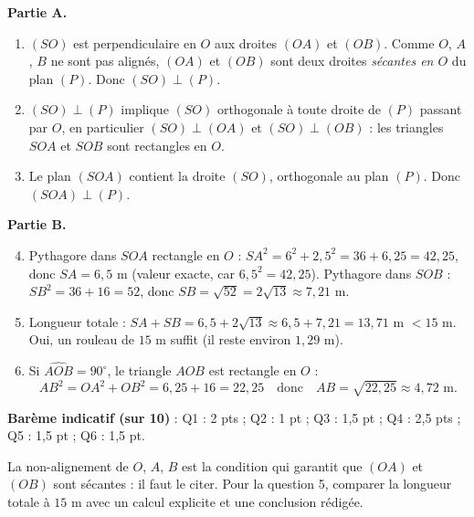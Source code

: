 \documentclass[11pt]{article}
\begin{document}
\begin{corrige}
\textbf{Partie A.}
\begin{enumerate}
\item $(SO)$ est perpendiculaire en $O$ aux droites $(OA)$ et $(OB)$. Comme $O$, $A$, $B$ ne sont pas alignés, $(OA)$ et $(OB)$ sont deux droites \emph{sécantes en $O$} du plan $(P)$. Donc $(SO) \perp (P)$.
\item $(SO) \perp (P)$ implique $(SO)$ orthogonale à toute droite de $(P)$ passant par $O$, en particulier $(SO) \perp (OA)$ et $(SO) \perp (OB)$ : les triangles $SOA$ et $SOB$ sont rectangles en $O$.
\item Le plan $(SOA)$ contient la droite $(SO)$, orthogonale au plan $(P)$. Donc $(SOA) \perp (P)$.
\end{enumerate}
\textbf{Partie B.}
\begin{enumerate}
\setcounter{enumi}{3}
\item Pythagore dans $SOA$ rectangle en $O$ : $SA^2 = 6^2 + 2{,}5^2 = 36 + 6{,}25 = 42{,}25$, donc $SA = 6{,}5$ m (valeur exacte, car $6{,}5^2 = 42{,}25$). Pythagore dans $SOB$ : $SB^2 = 36 + 16 = 52$, donc $SB = \sqrt{52} = 2\sqrt{13} \approx 7{,}21$ m.
\item Longueur totale : $SA + SB = 6{,}5 + 2\sqrt{13} \approx 6{,}5 + 7{,}21 = 13{,}71$ m $< 15$ m. Oui, un rouleau de $15$ m suffit (il reste environ $1{,}29$ m).
\item Si $\widehat{AOB} = 90^{\circ}$, le triangle $AOB$ est rectangle en $O$ :
\[ AB^2 = OA^2 + OB^2 = 6{,}25 + 16 = 22{,}25 \quad \text{donc} \quad AB = \sqrt{22{,}25} \approx 4{,}72 \text{ m}. \]
\end{enumerate}
\textbf{Barème indicatif (sur 10)} : Q1 : 2 pts ; Q2 : 1 pt ; Q3 : 1,5 pt ; Q4 : 2,5 pts ; Q5 : 1,5 pt ; Q6 : 1,5 pt.
\begin{attention}
La non-alignement de $O$, $A$, $B$ est la condition qui garantit que $(OA)$ et $(OB)$ sont sécantes : il faut le citer. Pour la question 5, comparer la longueur totale à $15$ m avec un calcul explicite et une conclusion rédigée.
\end{attention}
\end{corrige}
\end{document}
